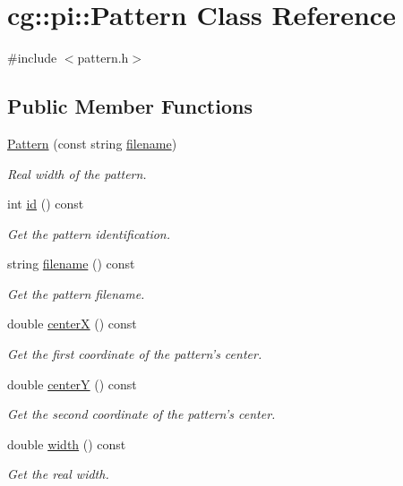 \hypertarget{classcg_1_1pi_1_1_pattern}{\section{cg\-:\-:pi\-:\-:\-Pattern \-Class \-Reference}
\label{classcg_1_1pi_1_1_pattern}
}


{\ttfamily \#include $<$pattern.\-h$>$}

\subsection*{\-Public \-Member \-Functions}
\begin{DoxyCompactItemize}
\item 
\hyperlink{classcg_1_1pi_1_1_pattern_af39ebdeb8e85644cb02cb7671338b255}{\-Pattern} (const string \hyperlink{classcg_1_1pi_1_1_pattern_a1c77577b1eda0e637170c23150ae7b12}{filename})
\begin{DoxyCompactList}\small\item\em \-Real width of the pattern. \end{DoxyCompactList}\item 
int \hyperlink{classcg_1_1pi_1_1_pattern_af1abe381ea33dfcd1aec24ede88ddd4f}{id} () const 
\begin{DoxyCompactList}\small\item\em \-Get the pattern identification. \end{DoxyCompactList}\item 
string \hyperlink{classcg_1_1pi_1_1_pattern_a1c77577b1eda0e637170c23150ae7b12}{filename} () const 
\begin{DoxyCompactList}\small\item\em \-Get the pattern filename. \end{DoxyCompactList}\item 
double \hyperlink{classcg_1_1pi_1_1_pattern_a02fff5247ce8d9b026d109e657a30d5d}{center\-X} () const 
\begin{DoxyCompactList}\small\item\em \-Get the first coordinate of the pattern's center. \end{DoxyCompactList}\item 
double \hyperlink{classcg_1_1pi_1_1_pattern_af792c9d1e955afad07e0c3c330ee55dd}{center\-Y} () const 
\begin{DoxyCompactList}\small\item\em \-Get the second coordinate of the pattern's center. \end{DoxyCompactList}\item 
double \hyperlink{classcg_1_1pi_1_1_pattern_ab4d8b6be0610bd1977bb3be9ceb916fc}{width} () const 
\begin{DoxyCompactList}\small\item\em \-Get the real width. \end{DoxyCompactList}\end{DoxyCompactItemize}


